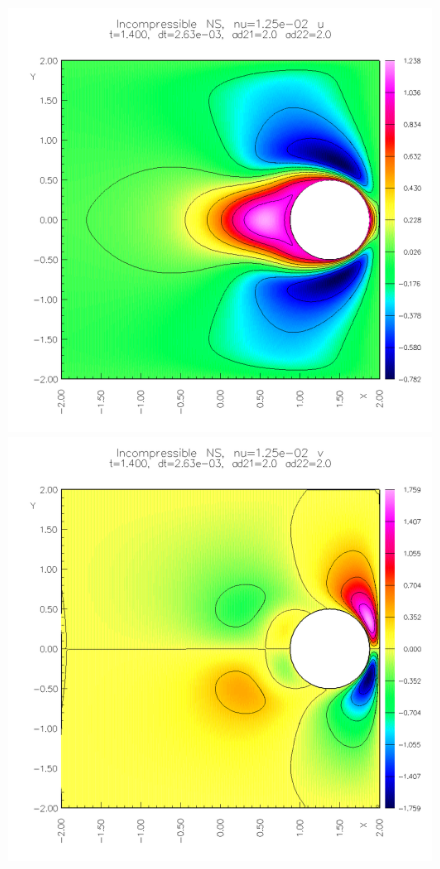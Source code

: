{\begin{figure}
\begin{center}
\includegraphics[width=\figWidth]{figures/collide5-u-1p4}  
\includegraphics[width=\figWidth]{figures/collide5-v-1p4}  
%

\end{center}
\end{figure}}
